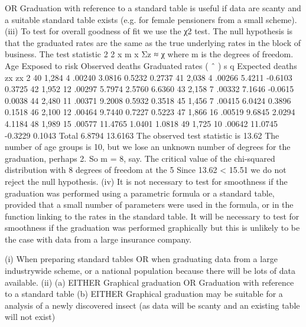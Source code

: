 OR
Graduation with reference to a standard table is useful if data are scanty and a
suitable standard table exists (e.g. for female pensioners from a small scheme).
(iii) To test for overall goodness of fit we use the χ2 test.
The null hypothesis is that the graduated rates are the same as the true underlying
rates in the block of business.
The test statistic 2 2
x m
x
Σz ≈ χ where m is the degrees of freedom.
Age Exposed
to risk
Observed
deaths
Graduated
rates ( ˆ ) s q
Expected
deaths
zx zx
2
40 1,284 4 .00240 3.0816 0.5232 0.2737
41 2,038 4 .00266 5.4211 -0.6103 0.3725
42 1,952 12 .00297 5.7974 2.5760 6.6360
43 2,158 7 .00332 7.1646 -0.0615 0.0038
44 2,480 11 .00371 9.2008 0.5932 0.3518
45 1,456 7 .00415 6.0424 0.3896 0.1518
46 2,100 12 .00464 9.7440 0.7227 0.5223
47 1,866 16 .00519 9.6845 2.0294 4.1184
48 1,989 15 .00577 11.4765 1.0401 1.0818
49 1,725 10 .00642 11.0745 -0.3229 0.1043
Total 6.8794 13.6163
The observed test statistic is 13.62
The number of age groups is 10, but we lose an unknown number of degrees for the
graduation, perhaps 2. So m = 8, say.
The critical value of the chi-squared distribution with 8 degrees of
freedom at the 5%
Since 13.62 < 15.51
we do not reject the null hypothesis.
(iv) It is not necessary to test for smoothness if the graduation was performed using a
parametric formula or a standard table, provided that a small number of parameters
were used in the formula, or in the function linking to the rates in the standard table.
It will be necessary to test for smoothness if the graduation was performed graphically
but this is unlikely to be the case with data from a large insurance company.

(i) When preparing standard tables OR when graduating data from a large industrywide
scheme, or a national population
because there will be lots of data available.
(ii) (a) EITHER Graphical graduation OR Graduation with reference to a standard
table
(b) EITHER
Graphical graduation may be suitable for a analysis of a newly discovered
insect (as data will be scanty and an existing table will not exist)

